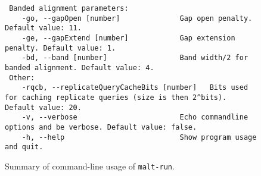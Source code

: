 \documentclass[11pt]{article}
\begin{document}
\begin{figure}[h]
{\begin{verbatim}
 Banded alignment parameters:
	-go, --gapOpen [number]              Gap open penalty. Default value: 11.
	-ge, --gapExtend [number]            Gap extension penalty. Default value: 1.
	-bd, --band [number]                 Band width/2 for banded alignment. Default value: 4.
 Other:
	-rqcb, --replicateQueryCacheBits [number]   Bits used for caching replicate queries (size is then 2^bits). Default value: 20.
	-v, --verbose                        Echo commandline options and be verbose. Default value: false.
	-h, --help                           Show program usage and quit.\end{verbatim}
}
\caption{Summary of command-line usage of {\tt malt-run}.}\label{fig:malt-run-usage}
\end{figure}


\FloatBarrier

{\small


}

\printindex
\end{document}
